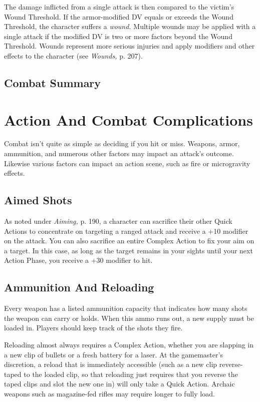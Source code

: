 The damage inflicted from a single attack is then compared
to the victim's Wound Threshold. If the armor-modified
DV equals or exceeds the Wound Threshold,
the character suffers a \textit{wound.} Multiple wounds may be 
applied with a single attack if the modified DV is two 
or more factors beyond the Wound Threshold. Wounds 
represent more serious injuries and apply modifiers and 
other effects to the character (see \textit{Wounds,} p. 207).

\subsection{Combat Summary}


\section{Action And Combat Complications}

Combat isn't quite as simple as deciding if you hit or 
miss. Weapons, armor, ammunition, and numerous 
other factors may impact an attack's outcome. Likewise
various factors can impact an action scene, such
as fire or microgravity effects.

\subsection{Aimed Shots}

As noted under \textit{Aiming,} p. 190, a character can sacrifice
their other Quick Actions to concentrate on targeting
a ranged attack and receive a +10 modifier on
the attack. You can also sacrifice an entire Complex 
Action to fix your aim on a target. In this case, as long 
as the target remains in your sights until your next 
Action Phase, you receive a +30 modifier to hit.

\subsection{Ammunition And Reloading}

Every weapon has a listed ammunition capacity that 
indicates how many shots the weapon can carry or 
holds. When this ammo runs out, a new supply must 
be loaded in. Players should keep track of the shots 
they fire.

Reloading almost always requires a Complex 
Action, whether you are slapping in a new clip of bullets
or a fresh battery for a laser. At the gamemaster's
discretion, a reload that is immediately accessible 
(such as a new clip reverse-taped to the loaded clip, so 
that reloading just requires that you reverse the taped 
clips and slot the new one in) will only take a Quick 
Action. Archaic weapons such as magazine-fed rifles 
may require longer to fully load.

